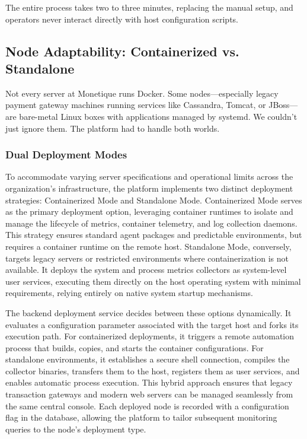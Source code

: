 \documentclass[12pt,a4paper]{report}
\begin{document}
The entire process takes two to three minutes, replacing the manual setup, and operators never interact directly with host configuration scripts.

\subsection{Node Adaptability: Containerized vs. Standalone}

Not every server at Monetique runs Docker. Some nodes---especially legacy payment gateway machines running services like Cassandra, Tomcat, or JBoss---are bare-metal Linux boxes with applications managed by systemd. We couldn't just ignore them. The platform had to handle both worlds.

\subsubsection{Dual Deployment Modes}

To accommodate varying server specifications and operational limits across the organization's infrastructure, the platform implements two distinct deployment strategies: Containerized Mode and Standalone Mode. Containerized Mode serves as the primary deployment option, leveraging container runtimes to isolate and manage the lifecycle of metrics, container telemetry, and log collection daemons. This strategy ensures standard agent packages and predictable environments, but requires a container runtime on the remote host. Standalone Mode, conversely, targets legacy servers or restricted environments where containerization is not available. It deploys the system and process metrics collectors as system-level user services, executing them directly on the host operating system with minimal requirements, relying entirely on native system startup mechanisms.

The backend deployment service decides between these options dynamically. It evaluates a configuration parameter associated with the target host and forks its execution path. For containerized deployments, it triggers a remote automation process that builds, copies, and starts the container configurations. For standalone environments, it establishes a secure shell connection, compiles the collector binaries, transfers them to the host, registers them as user services, and enables automatic process execution. This hybrid approach ensures that legacy transaction gateways and modern web servers can be managed seamlessly from the same central console. Each deployed node is recorded with a configuration flag in the database, allowing the platform to tailor subsequent monitoring queries to the node's deployment type.
\end{document}
